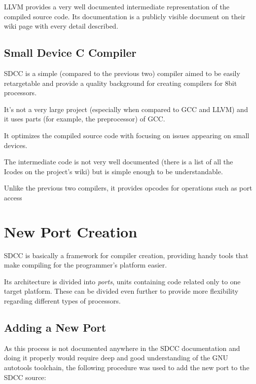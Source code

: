     LLVM provides a very well documented intermediate representation of the compiled source code. Its documentation is a publicly visible document on their wiki page with every detail described.

    \section{Small Device C Compiler}

    SDCC is a simple (compared to the previous two) compiler aimed to be easily retargetable and provide a quality background for creating compilers for 8bit processors.

    It's not a very large project (especially when compared to GCC and LLVM) and it uses parts (for example, the preprocessor) of GCC.

    It optimizes the compiled source code with focusing on issues appearing on small devices.

    The intermediate code is not very well documented (there is a list of all the Icodes on the project's wiki) but is simple enough to be understandable.

    Unlike the previous two compilers, it provides opcodes for operations such as port access %
    

\chapter{New Port Creation}\label{port}

SDCC is basically a framework for compiler creation, providing handy tools that make compiling for the programmer's platform easier.

Its architecture is divided into \emph{ports}, units containing code related only to one target platform. These can be divided even further to provide more flexibility regarding different types of processors.

    \section{Adding a New Port}

    As this process is not documented anywhere in the SDCC documentation and doing it properly would require deep and good understanding of the GNU autotools toolchain, the following procedure was used to add the new port to the SDCC source:



